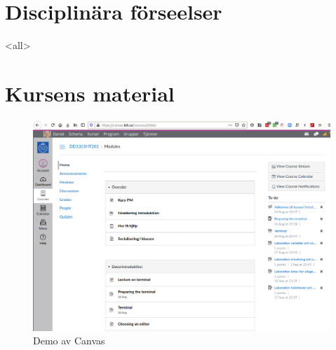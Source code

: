 

\section{Disciplinära förseelser}

\mode<all>{}



\section{Kursens material}

\begin{frame}
  \begin{figure}
    \includegraphics[height=0.8\textheight]{canvas.png}
    \caption{Demo av Canvas}
  \end{figure}
\end{frame}

